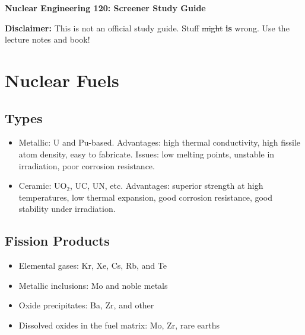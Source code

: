 \documentclass[letter]{article}
\begin{document}
\textbf{\Large{Nuclear Engineering 120: Screener Study Guide}} \\
\vspace{12pt}

\textbf{Disclaimer:} This is not an official study guide. Stuff \sout{might}
\textbf{is} wrong. Use the lecture notes and book!
\vspace{10pt}

\tableofcontents

\section{Nuclear Fuels}

\subsection{Types}
\begin{itemize}
\item Metallic: U and Pu-based. Advantages: high thermal conductivity,
  high fissile atom density, easy to fabricate. Issues: low melting
  points, unstable in irradiation, poor corrosion resistance.
\item Ceramic: UO$_2$, UC, UN, etc. Advantages: superior strength at
  high temperatures, low thermal expansion, good corrosion resistance,
  good stability under irradiation.
\end{itemize}

\subsection{Fission Products}
\begin{itemize}
\item Elemental gases: Kr, Xe, Cs, Rb, and Te
\item Metallic inclusions: Mo and noble metals
\item Oxide precipitates: Ba, Zr, and other
\item Dissolved oxides in the fuel matrix: Mo, Zr, rare earths
\end{itemize}
\end{document}
